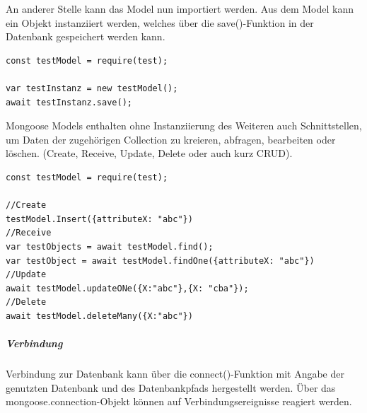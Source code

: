 
\noindent
An anderer Stelle kann das Model nun importiert werden. Aus dem Model kann ein Objekt instanziiert werden, welches über die save()-Funktion in der Datenbank gespeichert werden kann.

\begin{lstlisting}[caption=Model importieren - Objekt instanziieren und persistent speichern,label=lst:MongooseObjectInstance]
const testModel = require(test);

var testInstanz = new testModel();
await testInstanz.save();
\end{lstlisting}


\noindent
Mongoose Models enthalten ohne Instanziierung des Weiteren auch Schnittstellen, um Daten der zugehörigen Collection zu kreieren, abfragen, bearbeiten oder löschen. (Create, Receive, Update, Delete oder auch kurz CRUD).
\newline


\begin{lstlisting}[caption=CRUD-Beispielfunktionen eines Mongoose-Models,label=lst:MongooseCrud]
const testModel = require(test);

//Create
testModel.Insert({attributeX: "abc"})
//Receive
var testObjects = await testModel.find();
var testObject = await testModel.findOne({attributeX: "abc"})
//Update
await testModel.updateONe({X:"abc"},{X: "cba"});
//Delete
await testModel.deleteMany({X:"abc"})
\end{lstlisting}


\newpage
\subparagraph{Verbindung}
Verbindung zur Datenbank kann über die connect()-Funktion mit Angabe der genutzten Datenbank und des Datenbankpfads hergestellt werden. 
Über das mongoose.connection-Objekt können auf Verbindungsereignisse reagiert werden. 
\newline

